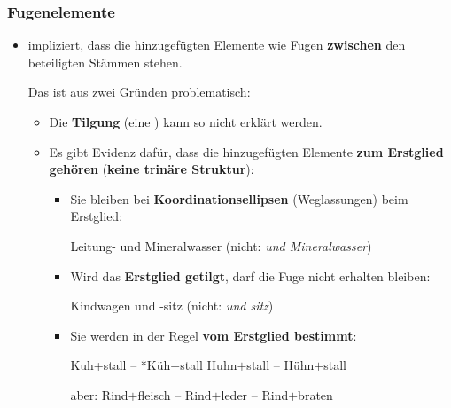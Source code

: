 \begin{frame}
\frametitle{Fugenelemente}

\begin{itemize}
	\item {} impliziert, dass die hinzugefügten Elemente wie Fugen \textbf{zwischen} den beteiligten Stämmen stehen. 
	
\medskip 
	
	Das ist aus zwei Gründen problematisch:

	\begin{itemize}
		\item Die \textbf{Tilgung} (eine ) kann so nicht erklärt werden.
		\item Es gibt Evidenz dafür, dass die hinzugefügten Elemente \textbf{zum Erstglied gehören} (\dash \textbf{keine trinäre Struktur}):

\pause 

\medskip 
	
	\begin{itemize}
		\item Sie bleiben bei \textbf{Koordinationsellipsen} (Weglassungen) beim Erstglied:
		
		\ea Leitung- und Mineral\alertred{\_}wasser (nicht: \emph{und Mineralwasser})
		\z

\pause 
		
		\item Wird das \textbf{Erstglied getilgt}, darf die Fuge nicht erhalten bleiben:
		
		\ea Kindwagen und -sitz (nicht: \emph{und sitz})
		\z

\pause 
		
		\item Sie werden in der Regel \textbf{vom Erstglied bestimmt}:
		
		\ea Kuh\alertred{\_}+stall -- *Küh$+$stall \vs *Huhn\alertred{\_}$+$stall -- Hühn$+$stall
		\z
		
		\ea aber: Rind\alertred{\_}$+$fleisch -- Rind$+$leder -- Rind$+$braten
		\z
		
	\end{itemize}

\end{itemize}
\end{itemize}
\end{frame}


